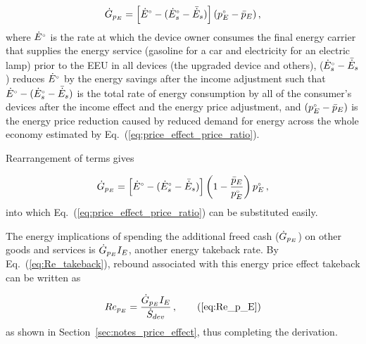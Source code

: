 \begin{equation}
  \dot{G}_{p_E} = \left[ {}{\dot{E}}^{\scriptscriptstyle \circ} - ({}{\dot{E}}^{\scriptscriptstyle \circ}_s - \bar{\dot{E}}_s) \right] ({}{p}^{\scriptscriptstyle \circ}_E - \bar{p}_E) \, ,
\end{equation}
%
where ${}{\dot{E}}^{\scriptscriptstyle \circ}$ is the rate at which the device owner
consumes the final energy carrier that supplies
the energy service
(gasoline for a car and
electricity for an electric lamp) 
prior to the EEU
in all devices (the upgraded device and others), 
(${}{\dot{E}}^{\scriptscriptstyle \circ}_s - \bar{\dot{E}}_s$) reduces 
${}{\dot{E}}^{\scriptscriptstyle \circ}$ by the energy savings after the income adjustment
such that
${}{\dot{E}}^{\scriptscriptstyle \circ} - ({}{\dot{E}}^{\scriptscriptstyle \circ}_s - \bar{\dot{E}}_s)$
is the total rate of energy consumption by all of the 
consumer's devices
after the income effect and the energy price adjustment, and
$({}{p}^{\scriptscriptstyle \circ}_E - \bar{p}_E)$ is the energy price reduction
caused by reduced demand for energy across 
the whole economy estimated by 
Eq.~(\ref{eq:price_effect_price_ratio}). 

Rearrangement of terms gives

\begin{equation}
  \dot{G}_{p_E} = \left[ {}{\dot{E}}^{\scriptscriptstyle \circ} - ({}{\dot{E}}^{\scriptscriptstyle \circ}_s - \bar{\dot{E}}_s) \right] \left( 1 - \frac{\bar{p}_E}{{}{p}^{\scriptscriptstyle \circ}_E} \right) {}{p}^{\scriptscriptstyle \circ}_E \, ,
\end{equation}
%
into which Eq.~(\ref{eq:price_effect_price_ratio})
can be substituted easily.

The energy implications of spending the additional freed cash
($\dot{G}_{p_E}$) on other goods and services is
$\dot{G}_{p_E} I_E$,
another energy takeback rate.
By Eq.~(\ref{eq:Re_takeback}),
rebound associated with this energy price effect takeback
can be written as

\begin{equation}
  Re_{p_E} = \frac{\rate{G}_{p_E} I_E}{\Sdot} \, , \tag{\ref{eq:Re_p_E}}
\end{equation}
%
as shown in Section~\ref{sec:notes_price_effect},
thus completing the derivation.




